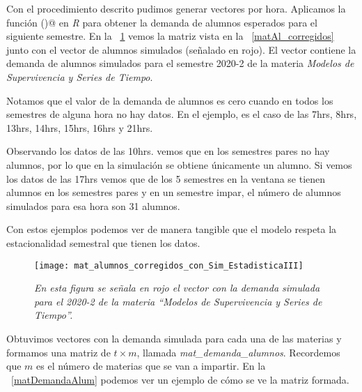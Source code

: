 Con el procedimiento descrito pudimos generar vectores por hora. Aplicamos la función \verb@hw()@ en \textit{R} para obtener la demanda de alumnos esperados para el siguiente semestre. En la \figurename{~\ref{matAl_corregidos_y_sim}} vemos la matriz vista en la \figurename{~\ref{matAl_corregidos}} junto con el vector de alumnos simulados (señalado en rojo). El vector contiene la demanda de alumnos simulados para el semestre 2020-2 de la materia \textit{Modelos de Supervivencia y Series de Tiempo}.

Notamos que el valor de la demanda de alumnos es cero cuando en todos los semestres de alguna hora no hay datos. En el ejemplo, es el caso de las 7hrs, 8hrs, 13hrs, 14hrs, 15hrs, 16hrs y 21hrs.

Observando los datos de las 10hrs. vemos que en los semestres pares no hay alumnos, por lo que en la simulación se obtiene únicamente un alumno. Si vemos los datos de las 17hrs vemos que de los 5 semestres en la ventana se tienen alumnos en los semestres pares y en un semestre impar, el número de alumnos simulados para esa hora son 31 alumnos.

Con estos ejemplos podemos ver de manera tangible que el modelo respeta la estacionalidad semestral que tienen los datos.

\begin{figure}[H]
\centering
\texttt{[image: mat\_alumnos\_corregidos\_con\_Sim\_EstadisticaIII]} %
\caption[\textit{Vector con demanda simulada para el 2020-2 de ``Modelos de Supervivencia y Series de Tiempo''}]{\textit{En esta figura se señala en rojo el vector con la demanda simulada para el 2020-2 de la materia ``Modelos de Supervivencia y Series de Tiempo''.}}\label{matAl_corregidos_y_sim}
\end{figure}


Obtuvimos vectores con la demanda simulada para cada una de las materias y formamos una matriz de $t \times m$, llamada \textit{mat\_demanda\_alumnos}. Recordemos que $m$ es el número de materias que se van a impartir. En la \figurename{~\ref{matDemandaAlum}} podemos ver un ejemplo de cómo se ve la matriz formada.

